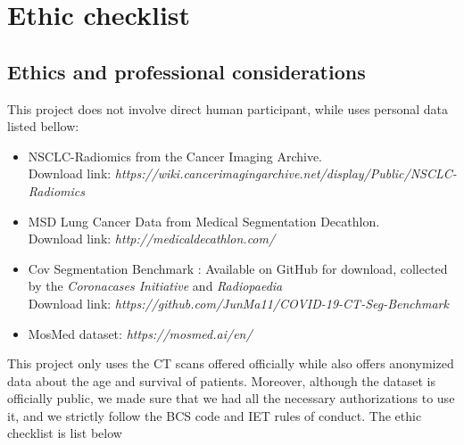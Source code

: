 \chapter{Ethic checklist}
\section{Ethics and professional considerations}

This project does not involve direct human participant, while uses personal data listed bellow:
\begin{itemize}
	\item NSCLC-Radiomics\cite{clark_cancer_2013} \cite{aerts_decoding_2014} from the Cancer Imaging Archive.\\
	Download link: \textit{https://wiki.cancerimagingarchive.net/display/Public/NSCLC-Radiomics}
	\item MSD Lung Cancer Data from Medical Segmentation Decathlon\cite{DBLP:journals/corr/abs-1902-09063}.\\
	Download link: \textit{http://medicaldecathlon.com/}
	\item Cov Segmentation Benchmark \cite{COVID-19-CT-Seg-Dataset}: Available on GitHub for download, collected by the \textit{Coronacases Initiative} and \textit{Radiopaedia} \\
	Download link: \textit{https://github.com/JunMa11/COVID-19-CT-Seg-Benchmark}
	\item MosMed dataset: \textit{https://mosmed.ai/en/}
	
\end{itemize}
 This project only uses the CT scans offered officially while also offers anonymized data about the age and survival of patients. Moreover, although the dataset is officially public, we made sure that we had all the necessary authorizations to use it, and we strictly follow the BCS code and IET rules of conduct. The ethic checklist is list below
\newpage
